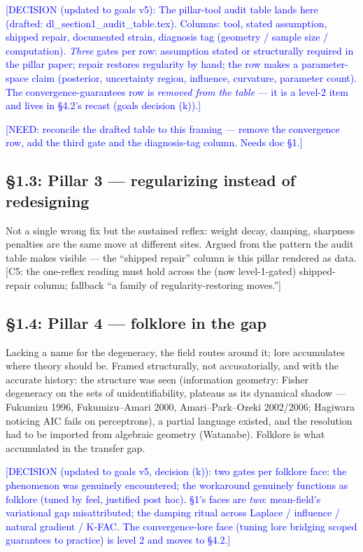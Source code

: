 \documentclass[11pt]{article}
\newcommand{\tagg}[1]{\textcolor{blue}{[#1]}}
\begin{document}
\tagg{DECISION (updated to goals v5): The pillar-tool audit table lands
here (drafted: dl\_section1\_audit\_table.tex). Columns: tool, stated
assumption, shipped repair, documented strain, diagnosis tag
(geometry / sample size / computation). \emph{Three} gates per row:
assumption stated or structurally required in the pillar paper; repair
restores regularity by hand; the row makes a parameter-space claim
(posterior, uncertainty region, influence, curvature, parameter count).
The convergence-guarantees row is \emph{removed from the table} --- it
is a level-2 item and lives in \S4.2's recast (goals decision (k)).}

\tagg{NEED: reconcile the drafted table to this framing --- remove the
convergence row, add the third gate and the diagnosis-tag column. Needs
doc \S1.}

\subsection*{\S1.3: Pillar 3 --- regularizing instead of redesigning}

Not a single wrong fix but the sustained reflex: weight decay, damping,
sharpness penalties are the same move at different sites. Argued from
the pattern the audit table makes visible --- the ``shipped repair''
column is this pillar rendered as data. [C5: the one-reflex reading
must hold across the (now level-1-gated) shipped-repair column;
fallback ``a family of regularity-restoring moves.'']

\subsection*{\S1.4: Pillar 4 --- folklore in the gap}

Lacking a name for the degeneracy, the field routes around it; lore
accumulates where theory should be. Framed structurally, not
accusatorially, and with the accurate history: the structure was seen
(information geometry: Fisher degeneracy on the sets of
unidentifiability, plateaus as its dynamical shadow --- Fukumizu 1996,
Fukumizu--Amari 2000, Amari--Park--Ozeki 2002/2006; Hagiwara noticing
AIC fails on perceptrons), a partial language existed, and the
resolution had to be imported from algebraic geometry (Watanabe).
Folklore is what accumulated in the transfer gap.

\tagg{DECISION (updated to goals v5, decision (k)): two gates per
folklore face: the phenomenon was genuinely encountered; the workaround
genuinely functions as folklore (tuned by feel, justified post hoc).
\S1's faces are \emph{two}: mean-field's variational gap misattributed;
the damping ritual across Laplace / influence / natural gradient /
K-FAC. The convergence-lore face (tuning lore bridging scoped
guarantees to practice) is level 2 and moves to \S4.2.}
\end{document}
